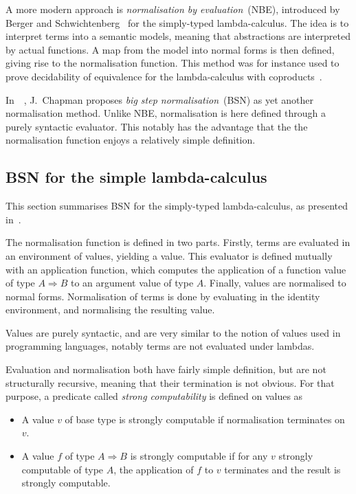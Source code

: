 \documentclass[a4paper,english,cleveref,autoref,draft]{lipics-v2019}
\newcommand{\Ra}{\Rightarrow}
\begin{document}
A more modern approach is \emph{normalisation by evaluation}~(NBE), introduced
by Berger and Schwichtenberg~\cite{berger1991inverse} for the simply-typed
lambda-calculus. The idea is to interpret terms into a semantic models,
meaning that abstractions are interpreted by actual functions.
A map from the model into normal forms is then defined, giving rise to the
normalisation function. 
This method was for instance used to prove decidability of equivalence for the
lambda-calculus with coproducts~\cite{altenkirch2001normalization}.

In~\cite{chapman2006tait}~\cite{chapman2009bsn}, J.~Chapman proposes
\emph{big step normalisation}~(BSN) as yet another normalisation method.
Unlike NBE, normalisation is here defined through a purely syntactic evaluator.
This notably has the advantage that the the normalisation function enjoys a
relatively simple definition.

\subsection{BSN for the simple lambda-calculus}
This section summarises BSN for the simply-typed lambda-calculus, as presented
in~\cite{chapman2009bsn}.

The normalisation function is defined in two parts. Firstly, terms are
evaluated in an environment of values, yielding a value. This evaluator
is defined mutually with an application function, which computes the application
of a function value of type $A \Ra B$ to an argument value of type $A$.
Finally, values are normalised to normal forms.
Normalisation of terms is done by evaluating in the identity environment,
and normalising the resulting value.

Values are purely syntactic, and are very similar to the notion of values used
in programming languages, notably terms are not evaluated under lambdas.

Evaluation and normalisation both have fairly simple definition, but are
not structurally recursive, meaning that their termination is not obvious.
For that purpose, a predicate called \emph{strong computability} is defined
on values as
\begin{itemize}
\item A value $v$ of base type is strongly computable if normalisation
  terminates on $v$.
\item A value $f$ of type $A \Ra B$ is strongly computable if for any $v$ strongly
  computable of type $A$, the application of $f$ to $v$ terminates and the
  result is strongly computable.
\end{itemize}
\end{document}
